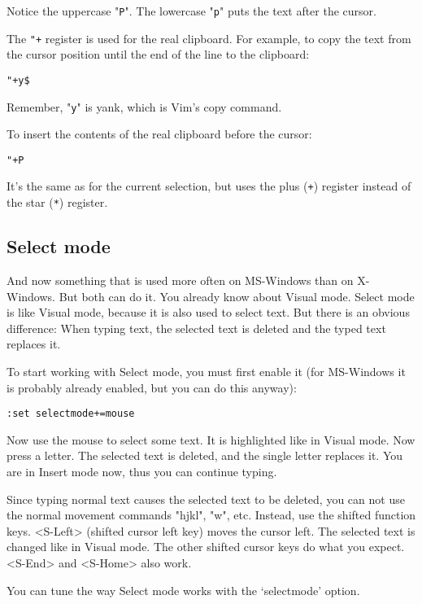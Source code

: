 Notice the uppercase "\verb!P!".
The lowercase "\verb!p!" puts the text after the cursor.

The \verb!"+! register is used for the real clipboard.
For example, to copy the text from the cursor position until the end of the line to the clipboard:

 \begin{Verbatim}[samepage=true]
 "+y$
 \end{Verbatim}

Remember, "\verb!y!" is yank, which is Vim's copy command.

To insert the contents of the real clipboard before the cursor:

 \begin{Verbatim}[samepage=true]
 "+P
 \end{Verbatim}

It's the same as for the current selection, but uses the plus (\verb!+!) register instead of the star (\verb!*!) register.
\subsection{Select mode}
\label{Select mode}
And now something that is used more often on MS-Windows than on X-Windows.
But both can do it.
You already know about Visual mode.
Select mode is like Visual mode, because it is also used to select text.
But there is an obvious difference: When typing text, the selected text is deleted and the typed text replaces it.

To start working with Select mode, you must first enable it (for MS-Windows it is probably already enabled, but you can do this anyway):

 \begin{Verbatim}[samepage=true]
 :set selectmode+=mouse
 \end{Verbatim}

Now use the mouse to select some text.
It is highlighted like in Visual mode.
Now press a letter.
The selected text is deleted, and the single letter replaces it.
You are in Insert mode now, thus you can continue typing.

Since typing normal text causes the selected text to be deleted, you can not use the normal movement commands "hjkl", "w", etc.
Instead, use the shifted function keys.
<S-Left> (shifted cursor left key) moves the cursor left.
The selected text is changed like in Visual mode.
The other shifted cursor keys do what you expect.
<S-End> and <S-Home> also work.

You can tune the way Select mode works with the `selectmode' option.
\clearpage
